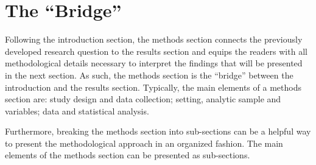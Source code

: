 \documentclass[
]{book}
\begin{document}
\hypertarget{the-bridge}{%
\section{The ``Bridge''}\label{the-bridge}}

Following the introduction section, the methods section connects the previously developed research question to the results section and equips the readers with all methodological details necessary to interpret the findings that will be presented in the next section. As such, the methods section is the ``bridge'' between the introduction and the results section. Typically, the main elements of a methods section are: study design and data collection; setting, analytic sample and variables; data and statistical analysis.

Furthermore, breaking the methods section into sub-sections can be a helpful way to present the methodological approach in an organized fashion. The main elements of the methods section can be presented as sub-sections.
\end{document}
